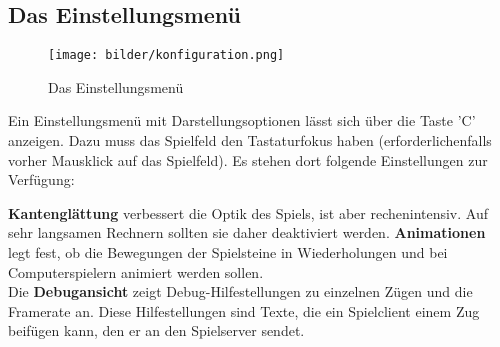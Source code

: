 \documentclass[a4paper, ngerman]{scrartcl}
\begin{document}
\subsection{Das Einstellungsmenü} 
	 \begin{figure}[h!]
		\centering
		\texttt{[image: bilder/konfiguration.png]}
		\caption{Das Einstellungsmenü}
		\label{fig:Configuration}
	\end{figure}
	
	Ein Einstellungsmenü mit Darstellungsoptionen lässt
sich über die Taste 'C' anzeigen. Dazu muss das
Spielfeld den Tastaturfokus haben (erforderlichenfalls
vorher Mausklick auf das Spielfeld). Es stehen dort
folgende Einstellungen zur Verfügung: 

\textbf{Kantenglättung} verbessert die Optik des
Spiels, ist aber rechenintensiv. Auf sehr langsamen Rechnern sollten sie daher
deaktiviert werden.
\textbf{Animationen} legt fest, ob die Bewegungen der Spielsteine in
Wiederholungen und bei Computerspielern animiert werden sollen.\\
Die \textbf{Debugansicht} zeigt Debug-Hilfestellungen zu einzelnen Zügen und
die Framerate an.
Diese Hilfestellungen sind Texte, die ein Spielclient einem Zug beifügen kann, den er
an den Spielserver sendet.
	
\end{document}
